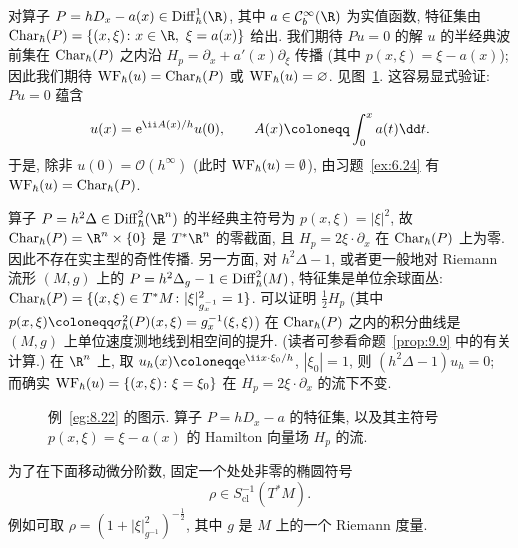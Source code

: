 \begin{example}[$hD_x - a$]\label{eg:8.22}
对算子 $P = hD_x - a(x) \in \Diff_\hbar^1(\R)$, 其中 $a \in \mathcal{C}_b^\infty(\R)$ 为实值函数, 特征集由 $\Char_\hbar(P) = \{(x, \xi) \colon x \in \R,\ \xi = a(x)\}$ 给出. 我们期待 $Pu = 0$ 的解 $u$ 的半经典波前集在 $\operatorname{Char}_\hbar(P)$ 之内沿 $H_p = \partial_x + a'(x)\partial_\xi$ 传播 (其中 $p(x, \xi) = \xi - a(x)$); 因此我们期待 $\operatorname{WF}_\hbar(u) = \operatorname{Char}_\hbar(P)$ 或 $\operatorname{WF}_\hbar(u) = \varnothing$. 见图~\ref{fig:8.6}. 这容易显式验证: $Pu = 0$ 蕴含
\begin{equation}\label{eq:8.89}
    u(x) = \ee^{\ii A(x)/h}u(0), \qquad A(x) \defeq \int_0^x a(t) \dd t.
\end{equation}
于是, 除非 $u(0) = \mathcal{O}(h^\infty)$ (此时 $\operatorname{WF}_\hbar(u) = \emptyset$), 由习题~\ref{ex:6.24} 有 $\operatorname{WF}_\hbar(u) = \operatorname{Char}_\hbar(P)$.
\end{example}

\begin{example}[Laplace 算子]\label{eg:8.23}
算子 $P = h^2\Delta \in \Diff_\hbar^2(\R^n)$ 的半经典主符号为 $p(x, \xi) = | \xi |^2$, 故 $\Char_\hbar(P) = \R^n \times \{0\}$ 是 $T^*\R^n$ 的零截面, 且 $H_p = 2\xi \cdot \partial_x$ 在 $\operatorname{Char}_\hbar(P)$ 上为零. 因此不存在实主型的奇性传播. 另一方面, 对 $h^2\Delta - 1$, 或者更一般地对 Riemann 流形 $(M, g)$ 上的 $P = h^2\Delta_g - 1 \in \operatorname{Diff}_\hbar^2(M)$, 特征集是单位余球面丛: $\operatorname{Char}_\hbar(P) = \{(x, \xi) \in T^*M \colon | \xi |_{g_x^{-1}}^2 = 1\}$. 可以证明 $\frac{1}{2}H_p$ (其中 $p(x, \xi) \defeq \sigma_\hbar^2(P)(x, \xi) = g_x^{-1}(\xi, \xi)$) 在 $\operatorname{Char}_\hbar(P)$ 之内的积分曲线是 $(M, g)$ 上单位速度测地线到相空间的提升. (读者可参看命题~\ref{prop:9.9} 中的有关计算.) 在 $\R^n$ 上, 取 $u_h(x) \defeq \ee^{\ii x \cdot \xi_0/h}$, $| \xi_0 | = 1$, 则 $(h^2\Delta - 1)u_h = 0$; 而确实 $\operatorname{WF}_\hbar(u) = \{(x, \xi) \colon \xi = \xi_0\}$ 在 $H_p = 2\xi \cdot \partial_x$ 的流下不变.
\end{example}

\begin{figure}[htbp]
\centering
\drawFigEightSix
\caption{例~\ref{eg:8.22} 的图示. 算子 $P = hD_x - a$ 的特征集, 以及其主符号 $p(x, \xi) = \xi - a(x)$ 的 Hamilton 向量场 $H_p$ 的流.}
\label{fig:8.6}
\end{figure}

为了在下面移动微分阶数, 固定一个处处非零的椭圆符号
\begin{equation}\label{eq:8.90}
    \rho \in S_{\mathrm{cl}}^{-1}(T^*M).
\end{equation}
例如可取 $\rho = (1 + | \xi |_{g^{-1}}^2)^{-\frac{1}{2}}$, 其中 $g$ 是 $M$ 上的一个 Riemann 度量.

